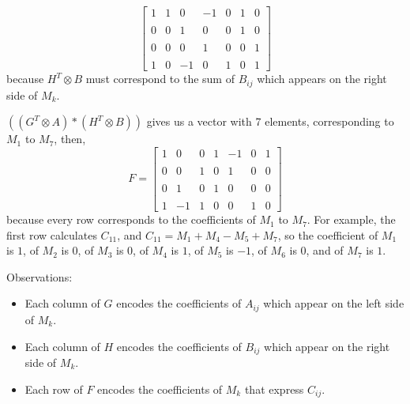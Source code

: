\documentclass[11pt]{article}
\begin{document}
\begin{solution}
\[\begin{bmatrix}
  1 & 1 & 0 &-1 & 0& 1& 0\\
\\
 0 & 0 & 1& 0& 0& 1& 0\\
\\
 0  & 0 & 0& 1& 0& 0& 1\\
\\
 1 & 0 & -1& 0& 1& 0& 1
\end{bmatrix}
\]
because $H^T \otimes B$ must correspond to the sum of $B_{ij}$ which appears on the right side of $M_{k}$.
\item$((G^T \otimes A) * (H^T \otimes B))$ gives us a vector with 7 elements, corresponding to $M_1$ to $M_7$, then,
 \[
F = 
\begin{bmatrix}
  1 & 0 & 0 & 1 & -1& 0& 1\\
\\
 0 & 0 & 1& 0& 1& 0& 0\\
\\
 0  & 1 & 0& 1& 0& 0& 0\\
\\
 1 & -1 & 1& 0& 0& 1& 0
\end{bmatrix}
\]
because every row corresponds to the coefficients of $M_1$ to $M_7$. For example, the first row calculates $C_{11}$, and $C_{11} = M_1 + M_4 - M_5 + M_7$, so the coefficient of $M_1$ is $1$, of $M_2$ is $0$, of $M_3$ is $0$, of $M_4$ is $1$, of $M_5$ is $-1$, of $M_6$ is $0$, and of $M_7$ is $1$. 
\item Observations:
\begin{itemize}
\item Each column of $G$ encodes the coefficients of $A_{ij}$ which appear on the left side of $M_{k}$.
\item Each column of $H$ encodes the coefficients of $B_{ij}$ which appear on the right side of $M_{k}$.
\item Each row of $F$ encodes the coefficients of $M_k$ that express $C_{ij}$.
\end{itemize}
\end{solution}


\setcounter{page}{10}
\end{document}
